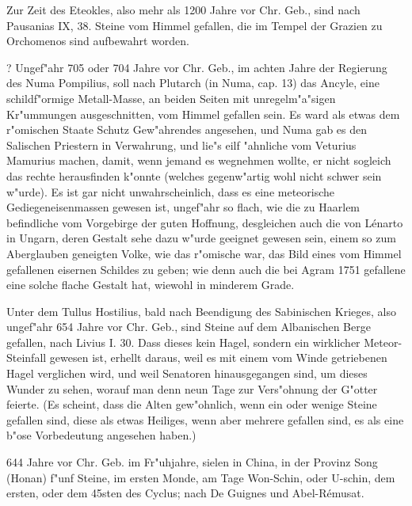 \documentclass[a4paper, 11pt, oneside, polutonikogreek, german]{article}
\begin{document}
Zur Zeit des Eteokles, also mehr als 1200 Jahre vor Chr. Geb., sind nach Pausanias IX, 38. Steine vom Himmel gefallen, die im Tempel der Grazien zu Orchomenos sind aufbewahrt worden.

? Ungef"ahr 705 oder 704 Jahre vor Chr. Geb., im achten Jahre der Regierung des Numa Pompilius, soll nach Plutarch (in Numa, cap. 13) das Ancyle, eine schildf"ormige Metall-Masse, an beiden Seiten mit unregelm"a"sigen Kr"ummungen ausgeschnitten, vom Himmel gefallen sein. Es ward als etwas dem r"omischen Staate Schutz Gew"ahrendes angesehen, und Numa gab es den Salischen Priestern in Verwahrung, und lie"s eilf "ahnliche vom Veturius Mamurius machen, damit, wenn jemand es wegnehmen wollte, er nicht sogleich das rechte herausfinden k"onnte (welches gegenw"artig wohl nicht schwer sein w"urde). Es ist gar nicht unwahrscheinlich, dass es eine meteorische Gediegeneisenmassen gewesen ist, ungef"ahr so flach, wie die zu Haarlem befindliche vom Vorgebirge der guten Hoffnung, desgleichen auch die von Lénarto in Ungarn, deren Gestalt sehe dazu w"urde geeignet gewesen sein, einem so zum Aberglauben geneigten Volke, wie das r"omische war, das Bild eines vom Himmel gefallenen eisernen Schildes zu geben; wie denn auch die bei Agram 1751 gefallene eine solche flache Gestalt hat, wiewohl in minderem Grade.

Unter dem Tullus Hostilius, bald nach Beendigung des Sabinischen Krieges, also ungef"ahr 654 Jahre vor Chr. Geb., sind Steine auf dem Albanischen Berge gefallen, nach Livius I. 30. Dass dieses kein Hagel, sondern ein wirklicher Meteor-Steinfall gewesen ist, erhellt daraus, weil es mit einem vom Winde getriebenen Hagel verglichen wird, und weil Senatoren hinausgegangen sind, um dieses Wunder zu sehen, worauf man denn neun Tage zur Vers"ohnung der G"otter feierte. (Es scheint, dass die Alten gew"ohnlich, wenn ein oder wenige Steine gefallen sind, diese als etwas Heiliges, wenn aber mehrere gefallen sind, es als eine b"ose Vorbedeutung angesehen haben.)

644 Jahre vor Chr. Geb. im Fr"uhjahre, sielen in China, in der Provinz Song (Honan) f"unf Steine, im ersten Monde, am Tage Won-Schin, oder U-schin, dem ersten, oder dem 45sten des Cyclus; nach De Guignes und Abel-Rémusat.
\end{document}
